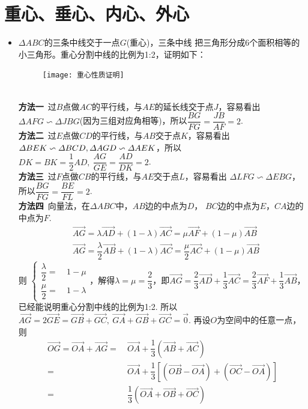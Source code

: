 \section{重心、垂心、内心、外心}
\begin{itemize}[leftmargin=\inteval{\myitemleftmargin}pt,itemsep=
   \inteval{\myitemitempsep}pt,topsep=\inteval{\myitemtopsep}pt]
\item $ \Delta ABC $的三条中线交于一点$ G $(重心)，三条中线
把三角形分成6个面积相等的小三角形。重心分割中线的比例为1:2，证明如下：
\begin{figure}[h]
    \centering
    \texttt{[image: 重心性质证明]}
\end{figure} \\
\textbf{方法一}\ 过$ B $点做$ AC $的平行线，与$ AE $的延长线交于点$ J $，容易看出
$ \Delta AFG \backsim \Delta JBG $(因为三组对应角相等)，所以$ \dfrac{BG}{FG}=
\dfrac{JB}{AF}=2 $. \\
\textbf{方法二}\ 过$ E $点做$ CD $的平行线，与$ AB $交于点$ K $，容易看出
$ \Delta BEK \backsim \Delta BCD,\\ \Delta AGD \backsim \Delta AEK $，所以
$ DK=BK=\dfrac{1}{2}AD,\ \dfrac{AG}{GE}=\dfrac{AD}{DK}=2 $. \\
\textbf{方法三}\ 过$ F $点做$ CB $的平行线，与$ AE $交于点$ L $，容易看出
$ \Delta LFG \backsim \Delta EBG $，所以$\dfrac{BG}{FG}=\dfrac{BE}{FL}=2 $. \\
\textbf{方法四}\ 向量法，在$ \Delta ABC $中，$ AB $边的中点为$ D $，
$ BC $边的中点为$ E $，$ CA $边的中点为$ F $. 
\begin{align*}
    & \vec{AG}=\lambda \vec{AD}+(1-\lambda)\vec{AC}=
    \mu \vec{AF}+(1-\mu)\vec{AB} \\
    & \vec{AG}=\dfrac{\lambda}{2} \vec{AB}+(1-\lambda)\vec{AC}=
    \dfrac{\mu}{2} \vec{AC}+(1-\mu)\vec{AB} 
\end{align*}
则 $ \begin{cases}
    \dfrac{\lambda}{2} =&\ 1-\mu  \\
    \dfrac{\mu}{2} =&\ 1-\lambda
\end{cases} $，解得$ \lambda=\mu=\dfrac{2}{3} $，即$ \vec{AG}=
\dfrac{2}{3}\vec{AD}+\dfrac{1}{3}\vec{AC}=
\dfrac{2}{3}\vec{AF}+\dfrac{1}{3}\vec{AB} $，
已经能说明重心分割中线的比例为1:2. 所以$ \vec{AG}=
2\vec{GE}=\vec{GB}+\vec{GC}, 
\ \vec{GA}+\vec{GB}+\vec{GC}=
\vec{0} $. 再设$ O $为空间中的任意一点，则
\begin{align*}
    \vec{OG}=\vec{OA}+\vec{AG} =&\ 
    \vec{OA}+\dfrac{1}{3}\left(\vec{AB}+
    \vec{AC} \right) \\
    =&\ \vec{OA}+\dfrac{1}{3} \left[\left( \vec{OB} 
    -\vec{OA}\right) + \left( \vec{OC} -\vec{OA}\right)\right]  \\
    =&\ \dfrac{1}{3}\left(\vec{OA}+\vec{OB}+
    \vec{OC} \right) 
\end{align*}


\end{itemize}
